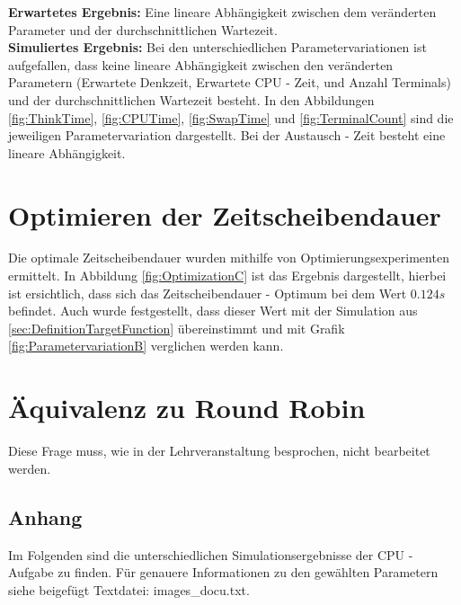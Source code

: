 \documentclass[
a4paper,   
headsepline, 
fleqn,     
11pt
]{scrartcl}
\begin{document}
\textbf{Erwartetes Ergebnis:} Eine lineare Abhängigkeit zwischen dem veränderten Parameter und der durchschnittlichen Wartezeit. \\

\textbf{Simuliertes Ergebnis:} Bei den unterschiedlichen Parametervariationen ist aufgefallen, dass keine lineare Abhängigkeit zwischen den veränderten Parametern (Erwartete Denkzeit, Erwartete CPU - Zeit, und Anzahl Terminals) und der durchschnittlichen Wartezeit besteht. In den Abbildungen \ref{fig:ThinkTime}, \ref{fig:CPUTime}, \ref{fig:SwapTime} und \ref{fig:TerminalCount} sind die jeweiligen Parametervariation dargestellt. Bei der Austausch - Zeit besteht eine lineare Abhängigkeit.

\section{Optimieren der Zeitscheibendauer}
Die optimale Zeitscheibendauer wurden mithilfe von Optimierungsexperimenten ermittelt. In Abbildung \ref{fig:OptimizationC} ist das Ergebnis dargestellt, hierbei ist ersichtlich, dass sich das Zeitscheibendauer - Optimum bei dem Wert $0.124s$ befindet. Auch wurde festgestellt, dass dieser Wert mit der Simulation aus \ref{sec:DefinitionTargetFunction} übereinstimmt und mit Grafik \ref{fig:ParametervariationB} verglichen werden kann.

\section{Äquivalenz zu Round Robin}
Diese Frage muss, wie in der Lehrveranstaltung besprochen, nicht bearbeitet werden.

\newpage

\subsection*{Anhang}
Im Folgenden sind die unterschiedlichen Simulationsergebnisse der CPU - Aufgabe zu finden. Für genauere Informationen zu den gewählten Parametern siehe beigefügt Textdatei: images\_docu.txt.
\end{document}
